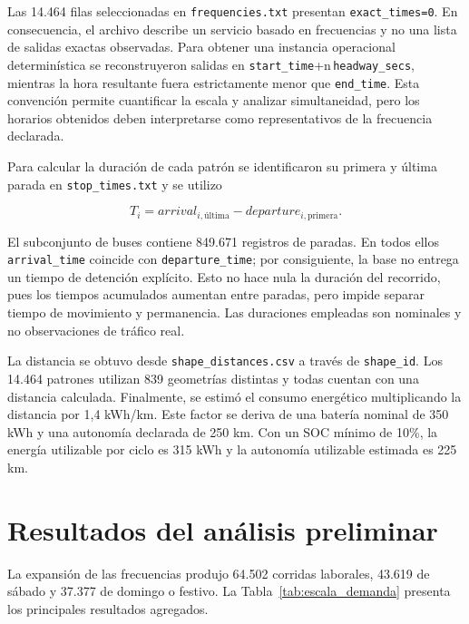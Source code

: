 Las 14.464 filas seleccionadas en \texttt{frequencies.txt} presentan
\texttt{exact\_times=0}. En consecuencia, el archivo describe un servicio
basado en frecuencias y no una lista de salidas exactas observadas. Para obtener
una instancia operacional determinística se reconstruyeron salidas en
\texttt{start\_time}+n\,\texttt{headway\_secs}, mientras la hora resultante
fuera estrictamente menor que \texttt{end\_time}. Esta convención permite
cuantificar la escala y analizar simultaneidad, pero los horarios obtenidos deben
interpretarse como representativos de la frecuencia declarada.

Para calcular la duración de cada patrón se identificaron su primera y última
parada en \texttt{stop\_times.txt} y se utilizo

\begin{equation}
 T_i = arrival_{i,\mathrm{última}}-departure_{i,\mathrm{primera}}.
 \label{eq:duracion_patron}
\end{equation}

El subconjunto de buses contiene 849.671 registros de paradas. En todos ellos
\texttt{arrival\_time} coincide con \texttt{departure\_time}; por consiguiente,
la base no entrega un tiempo de detención explícito. Esto no hace nula la
duración del recorrido, pues los tiempos acumulados aumentan entre paradas, pero
impide separar tiempo de movimiento y permanencia. Las duraciones empleadas son
nominales y no observaciones de tráfico real.

La distancia se obtuvo desde \texttt{shape\_distances.csv} a través de
\texttt{shape\_id}. Los 14.464 patrones utilizan 839 geometrías distintas y
todas cuentan con una distancia calculada. Finalmente, se estimó el consumo
energético multiplicando la distancia por 1,4 kWh/km. Este factor se deriva de
una batería nominal de 350 kWh y una autonomía declarada de 250 km. Con un SOC
mínimo de 10\%, la energía utilizable por ciclo es 315 kWh y la autonomía
utilizable estimada es 225 km.

\section{Resultados del análisis preliminar}

La expansión de las frecuencias produjo 64.502 corridas laborales, 43.619 de
sábado y 37.377 de domingo o festivo. La Tabla~\ref{tab:escala_demanda} presenta
los principales resultados agregados.

